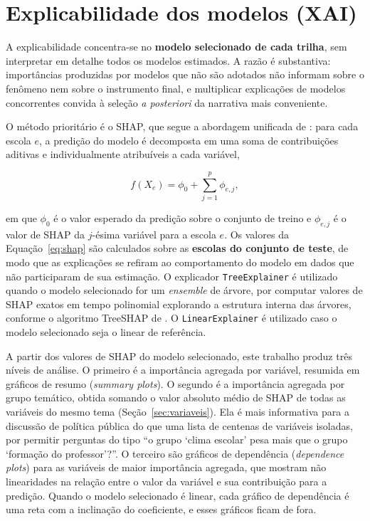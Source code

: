 \section{Explicabilidade dos modelos (XAI)}
\label{sec:xai}

A explicabilidade concentra-se no \textbf{modelo selecionado de cada
trilha}, sem interpretar em detalhe todos os modelos estimados.
A razão é substantiva: importâncias produzidas por modelos que não são
adotados não informam sobre o fenômeno nem sobre o instrumento final, e
multiplicar explicações de modelos concorrentes convida à seleção
\textit{a posteriori} da narrativa mais conveniente.

O método prioritário é o SHAP, que segue a abordagem unificada de
: para cada escola $e$, a predição do
modelo é decomposta em uma soma de contribuições aditivas e individualmente
atribuíveis a cada variável,

\begin{equation}
    f(X_e) = \phi_0 + \sum_{j=1}^{p} \phi_{e,j},
    \label{eq:shap}
\end{equation}

em que $\phi_0$ é o valor esperado da predição sobre o conjunto de treino e
$\phi_{e,j}$ é o valor de SHAP da $j$-ésima variável para a escola $e$.
Os valores da Equação~\ref{eq:shap} são calculados sobre as \textbf{escolas do conjunto de
teste}, de modo que as explicações se refiram ao comportamento do modelo em
dados que não participaram de sua estimação. O explicador
\texttt{TreeExplainer} é utilizado quando o modelo selecionado for um
\textit{ensemble} de árvore, por computar valores de SHAP exatos em tempo
polinomial explorando a estrutura interna das árvores, conforme o algoritmo
TreeSHAP de . O \texttt{LinearExplainer} é
utilizado caso o modelo selecionado seja o linear de referência.

A partir dos valores de SHAP do modelo selecionado, este trabalho produz
três níveis de análise. O primeiro é a importância agregada por variável,
resumida em gráficos de resumo (\textit{summary plots}). O segundo é a
importância agregada por grupo temático, obtida somando o valor absoluto
médio de SHAP de todas as variáveis do mesmo tema
(Seção~\ref{sec:variaveis}). Ela é mais informativa para a discussão de
política pública do que uma lista de centenas de variáveis isoladas, por
permitir perguntas do tipo ``o grupo `clima escolar' pesa mais que o grupo
`formação do professor'?''. O terceiro são gráficos de dependência
(\textit{dependence plots}) para as variáveis de maior importância
agregada, que mostram não linearidades na relação entre o valor da
variável e sua contribuição para a predição. Quando o modelo selecionado
é linear, cada gráfico de dependência é uma reta com a inclinação do
coeficiente, e esses gráficos ficam de fora.

